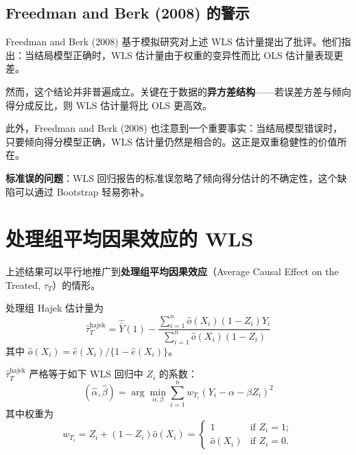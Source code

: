 \subsection{Freedman and Berk (2008) 的警示}\label{sec:14-3-3}

Freedman and Berk (2008) 基于模拟研究对上述 WLS 估计量提出了批评。他们指出：当结局模型正确时，WLS 估计量由于权重的变异性而比 OLS 估计量表现更差。

然而，这个结论并非普遍成立。关键在于数据的\textbf{异方差结构}——若误差方差与倾向得分成反比，则 WLS 估计量将比 OLS 更高效。

此外，Freedman and Berk (2008) 也注意到一个重要事实：当结局模型错误时，只要倾向得分模型正确，WLS 估计量仍然是相合的。这正是双重稳健性的价值所在。

\textbf{标准误的问题}：WLS 回归报告的标准误忽略了倾向得分估计的不确定性，这个缺陷可以通过 Bootstrap 轻易弥补。


\section{处理组平均因果效应的 WLS}\label{sec:14-4}

上述结果可以平行地推广到\textbf{处理组平均因果效应}（Average Causal Effect on the Treated, $\tau_T$）的情形。

处理组 Hajek 估计量为
\[
\hat{\tau}_{T}^{\text{hajek}}
= \hat{\bar{Y}}(1) - \frac{\sum_{i=1}^n \hat{o}(X_i)(1-Z_i)Y_i}{\sum_{i=1}^n \hat{o}(X_i)(1-Z_i)}
\]
其中 $\hat{o}(X_i) = \hat{e}(X_i)/\{1-\hat{e}(X_i)\}$。

\begin{Proposition}\label{prop:14.2}
$\hat{\tau}_{T}^{\text{hajek}}$ 严格等于如下 WLS 回归中 $Z_i$ 的系数：
\[
(\hat{\alpha}, \hat{\beta}) = \arg\min_{\alpha,\beta} \sum_{i=1}^n w_{T_i}(Y_i - \alpha - \beta Z_i)^2
\]
其中权重为
\begin{equation}\label{eq:wls-weights-14.2}
w_{T_i} = Z_i + (1-Z_i)\hat{o}(X_i)
= \begin{cases}
1 & \text{if } Z_i = 1; \\[6pt]
\hat{o}(X_i) & \text{if } Z_i = 0.
\end{cases}
\end{equation}
\end{Proposition}

